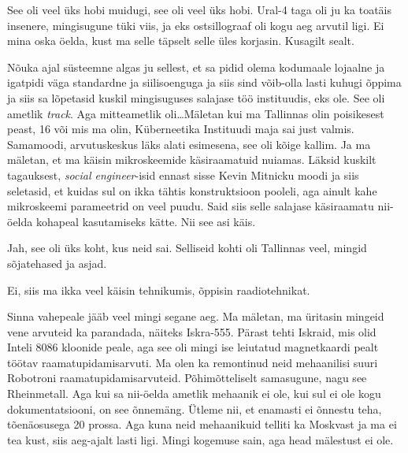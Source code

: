 
See oli veel üks hobi muidugi, see oli veel üks hobi. Ural-4 taga oli ju ka toatäis insenere, mingisugune tüki viis, ja eks ostsillograaf oli kogu aeg arvutil ligi. Ei mina oska öelda, kust ma selle täpselt selle üles korjasin. Kusagilt sealt. 


Nõuka ajal süsteemne algas ju sellest, et sa pidid olema kodumaale lojaalne ja igatpidi väga standardne ja siilisoenguga ja siis sind võib-olla lasti kuhugi õppima ja siis sa lõpetasid kuskil mingisuguses salajase töö instituudis, eks ole. See oli  ametlik \emph{track}. Aga mitteametlik oli\ldots Mäletan kui ma Tallinnas olin poisikesest peast,  16 või mis ma olin, Küberneetika Instituudi maja sai just valmis. Samamoodi, arvutuskeskus läks alati esimesena, see oli kõige kallim. Ja  ma mäletan, et ma käisin  mikroskeemide käsiraamatuid nuiamas. Läksid kuskilt tagauksest, \emph{social engineer}-isid ennast sisse Kevin Mitnicku moodi ja siis seletasid, et kuidas sul on ikka tähtis konstruktsioon pooleli, aga ainult kahe mikroskeemi parameetrid on veel puudu. Said siis selle salajase käsiraamatu nii-öelda kohapeal kasutamiseks kätte. Nii see asi käis. 


Jah, see oli üks koht, kus neid sai. Selliseid kohti oli Tallinnas veel,  mingid sõjatehased ja asjad. 


Ei, siis ma ikka veel käisin tehnikumis, õppisin raadiotehnikat. 


Sinna vahepeale jääb veel mingi segane aeg. Ma mäletan, ma üritasin mingeid vene arvuteid ka parandada, näiteks Iskra-555.  Pärast tehti Iskraid, mis olid Inteli 8086 kloonide peale, aga see oli mingi ise leiutatud magnetkaardi pealt töötav raamatupidamisarvuti. Ma olen ka remontinud neid mehaanilisi suuri Robotroni raamatupidamisarvuteid. Põhimõtteliselt samasugune, nagu see Rheinmetall. Aga kui sa nii-öelda ametlik mehaanik ei ole, kui sul ei ole kogu dokumentatsiooni, on see õnnemäng. Ütleme nii, et enamasti ei õnnestu teha, tõenäosusega 20 prossa. Aga kuna neid mehaanikuid telliti ka Moskvast ja ma ei tea kust, siis aeg-ajalt lasti ligi. Mingi kogemuse sain, aga head mälestust ei ole. 

